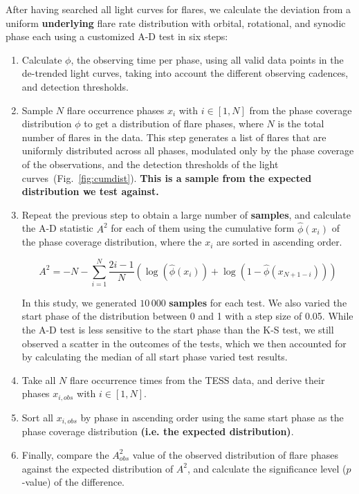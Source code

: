 \documentclass[fleqn,usenatbib]{mnras}%
\begin{document}
After having searched all light curves for flares, we calculate the deviation from a uniform \textbf{underlying} flare rate distribution with orbital, rotational, and synodic phase each using a customized A-D test in six steps:
\begin{enumerate}
\item Calculate $\phi$, the observing time per phase, using all valid data points in the de-trended light curves, taking into account the different observing cadences, and detection thresholds.
\item Sample $N$ flare occurrence phases $x_i$ with $i \in [1,N]$ from the phase coverage distribution $\phi$ to get a distribution of flare phases, where $N$ is the total number of flares in the data. This step generates a list of flares that are uniformly distributed across all phases, modulated only by the phase coverage of the observations, and the detection thresholds of the light curves~(Fig.~\ref{fig:cumdist}). \textbf{This is a sample from the expected distribution we test against.} 
\item Repeat the previous step to obtain a large number of \textbf{samples}, and calculate the A-D statistic $A^2$ for each of them using the cumulative form $\hat{\phi}(x_i)$ of the phase coverage distribution, where the $x_i$ are sorted in ascending order. 

\begin{equation}
A^2 = - N -\displaystyle\sum_{i=1}^N \dfrac{2i-1}{N}\left(\log(\hat{\phi}(x_i))+\log(1-\hat{\phi}(x_{N+1-i}))\right)
\end{equation}

In this study, we generated $10\,000$ \textbf{samples} for each test. We also varied the start phase of the distribution between 0 and 1 with a step size of 0.05. While the A-D test is less sensitive to the start phase than the K-S test, we still observed a scatter in the outcomes of the tests, which we then accounted for by calculating the median of all start phase varied test results.
\item Take all $N$ flare occurrence times from the TESS data, and derive their phases $x_{i,obs}$ with $i \in [1,N]$. 
\item Sort all $x_{i,obs}$ by phase in ascending order using the same start phase as the phase coverage distribution \textbf{(i.e. the expected distribution)}.
\item Finally, compare the $A^2_{obs}$ value of the observed distribution of flare phases against the expected distribution of $A^2$, and calculate the significance level ($p$-value) of the difference. 
\end{enumerate}
\end{document}
